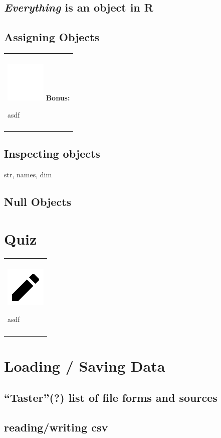 \documentclass[
]{book}
\newenvironment{bonus}
{
  \begin{center}
  \begin{tabular}{|>{\columncolor{bonus}\color{white}}p{0.9\textwidth}|}\hline\\
  \includegraphics[scale=0.1]{src/images/sun-fill-invert.png}
  \textbf{Bonus:}
}
{\\\\\hline
  \end{tabular}
  \end{center}
}
\newenvironment{assessment}
{
  \begin{center}
  \begin{tabular}{|>{\columncolor{assessment}}p{0.9\textwidth}|}
  \hline\\
  \includegraphics[scale=0.1]{src/images/pencil-fill.png}
}
{\\\\\hline
  \end{tabular}
  \end{center}
}
\begin{document}
\hypertarget{everything-is-an-object-in-r}{%
\subsection{\texorpdfstring{\emph{Everything} is an object in R}{Everything is an object in R}}\label{everything-is-an-object-in-r}}

\hypertarget{assigning-objects}{%
\subsection{Assigning Objects}\label{assigning-objects}}

\begin{bonus}
asdf
\end{bonus}

\hypertarget{inspecting-objects}{%
\subsection{Inspecting objects}\label{inspecting-objects}}

str, names, dim

\hypertarget{null-objects}{%
\subsection{Null Objects}\label{null-objects}}

\hypertarget{quiz}{%
\section{Quiz}\label{quiz}}

\begin{assessment}
asdf
\end{assessment}

\hypertarget{loading-saving-data}{%
\section{Loading / Saving Data}\label{loading-saving-data}}

\hypertarget{taster-list-of-file-forms-and-sources}{%
\subsection{``Taster''(?) list of file forms and sources}\label{taster-list-of-file-forms-and-sources}}

\hypertarget{readingwriting-csv}{%
\subsection{reading/writing csv}\label{readingwriting-csv}}
\end{document}
